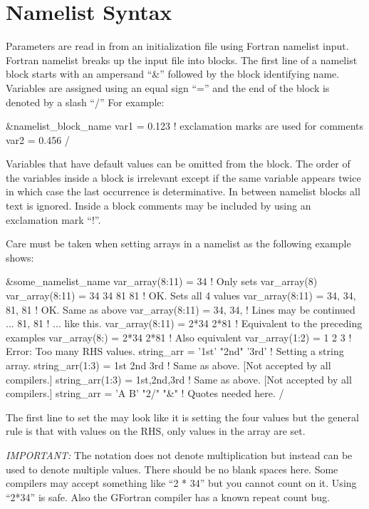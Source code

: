 \section{Namelist Syntax}
\label{s:format}

Parameters are read in from an initialization file using Fortran namelist input. Fortran namelist
breaks up the input file into blocks. The first line of a namelist block starts with an ampersand
``\&'' followed by the block identifying name. Variables are assigned using an equal sign ``='' and
the end of the block is denoted by a slash ``/'' For example:
\begin{example}
  &namelist_block_name
    var1 = 0.123   ! exclamation marks are used for comments
    var2 = 0.456
  /
\end{example}
Variables that have default values can be omitted from the block.  The order of the variables inside
a block is irrelevant except if the same variable appears twice in which case the last occurrence is
determinative.  In between namelist blocks all text is ignored. Inside a block comments may be
included by using an exclamation mark ``!''.

Care must be taken when setting arrays in a namelist as the following example shows:
\begin{example}
  &some_namelist_name
    var_array(8:11) = 34             ! Only sets var_array(8)
    var_array(8:11) = 34 34 81 81    ! OK. Sets all 4 values
    var_array(8:11) = 34, 34, 81, 81 ! OK. Same as above
    var_array(8:11) = 34, 34,        ! Lines may be continued ...
                      81, 81         !   ... like this.
    var_array(8:11) = 2*34 2*81      ! Equivalent to the preceding examples
    var_array(8:)   = 2*34 2*81      ! Also equivalent
    var_array(1:2) = 1 2 3           ! Error: Too many RHS values.
    string_arr = '1st' "2nd" '3rd'   ! Setting a string array.
    string_arr(1:3) = 1st 2nd 3rd    ! Same as above. [Not accepted by all compilers.]
    string_arr(1:3) = 1st,2nd,3rd    ! Same as above. [Not accepted by all compilers.]
    string_arr = 'A B' "2/" "&"      ! Quotes needed here.
  /
\end{example}
The first line to set the  may look like it is setting the four values
 but the general rule is that with  values on the RHS, only  values
in the array are set.

{\em IMPORTANT:} The notation  does not denote multiplication but instead can be used to
denote multiple values. There should be no blank spaces here. Some compilers may accept something
like ``2 * 34'' but you cannot count on it. Using ``2*34'' is safe. Also the GFortran compiler has a known
repeat count bug.

